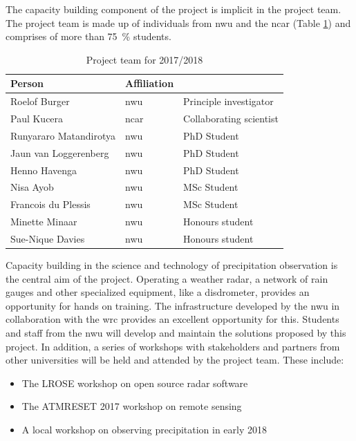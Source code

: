 \documentclass{wrcreport}
\begin{document}
The capacity building component of the project is implicit in the
project team. The project team is made up of individuals from
\gls{nwu} and the \gls{ncar} (Table \ref{table:team}) and comprises of
more than \SI{75}{\percent} students.

\begin{table}[!htbp]
\caption{Project team for 2017/2018}
\label{table:team}
\begin{center}
\begin{tabular}{ l l l } 
\toprule
\bfseries Person & \bfseries Affiliation \\
\midrule
Roelof Burger & \gls{nwu}& Principle investigator \\
Paul Kucera  & \gls{ncar}& Collaborating scientist \\
Runyararo Matandirotya & \gls{nwu} & PhD Student \\
Jaun van Loggerenberg & \gls{nwu} & PhD Student \\
Henno Havenga & \gls{nwu} & PhD Student \\
Nisa Ayob & \gls{nwu} & MSc Student \\
Francois du Plessis & \gls{nwu} & MSc Student \\
Minette Minaar & \gls{nwu} & Honours student \\
Sue-Nique Davies & \gls{nwu} & Honours student \\
\bottomrule 
\end{tabular}
\end{center}
\end{table}

Capacity building in the science and technology of precipitation
observation is the central aim of the project. Operating a weather
radar, a network of rain gauges and other specialized equipment, like
a disdrometer, provides an opportunity for hands on training. The
infrastructure developed by the \gls{nwu} in collaboration with the
\gls{wrc} provides an excellent opportunity for this. Students and
staff from the \gls{nwu} will develop and maintain the solutions
proposed by this project. In addition, a series of workshops with
stakeholders and partners from other universities will be held and
attended by the project team. These include:

\begin{itemize}
\item The LROSE workshop on open source radar software
\item The ATMRESET 2017 workshop on remote sensing
\item A local workshop on observing precipitation in early 2018
\end{itemize}
\end{document}
